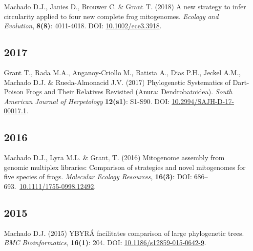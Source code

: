 \documentclass[11pt, letterpaper, sans]{moderncv}
\begin{document}
    {\setlength{\parskip}{.5em}\renewcommand{\baselinestretch}{2.0}\begin{hangparas}{.25in}{1}
		Machado D.J., Janies D., Brouwer C. \& Grant T. (2018) A new strategy to infer circularity applied to four new complete frog mitogenomes. \emph{Ecology and Evolution}, \textbf{8(8)}: 4011-4018. DOI: \href{http://doi.wiley.com/10.1002/ece3.3918}{10.1002/ece3.3918}.
	\end{hangparas}}


\subsection{2017}

    {\setlength{\parskip}{.5em}\renewcommand{\baselinestretch}{2.0}\begin{hangparas}{.25in}{1}
		Grant T., Rada M.A., Anganoy-Criollo M., Batista A., Dias P.H., Jeckel A.M., Machado D.J. \& Rueda-Almonacid J.V. (2017) Phylogenetic Systematics of Dart-Poison Frogs and Their Relatives Revisited (Anura: Dendrobatoidea). \emph{South American Journal of Herpetology} \textbf{12(s1)}: S1-S90. DOI: \href{http://www.bioone.org/doi/10.2994/SAJH-D-17-00017.1}{10.2994/SAJH-D-17-00017.1}.
	\end{hangparas}}


\subsection{2016}

    {\setlength{\parskip}{.5em}\renewcommand{\baselinestretch}{2.0}\begin{hangparas}{.25in}{1}
		Machado D.J., Lyra M.L. \& Grant, T. (2016) Mitogenome assembly from genomic multiplex libraries: Comparison of strategies and novel mitogenomes for five species of frogs. \emph{Molecular Ecology Resources}, \textbf{16(3)}: DOI: 686--693.~\href{https://doi.org/10.1111/1755-0998.12492}{10.1111/1755-0998.12492}.
	\end{hangparas}}


\subsection{2015}

    {\setlength{\parskip}{.5em}\renewcommand{\baselinestretch}{2.0}\begin{hangparas}{.25in}{1}
		Machado D.J. (2015) YBYRÁ facilitates comparison of large phylogenetic trees. \emph{BMC Bioinformatics}, \textbf{16(1)}: 204. DOI: \href{https://doi.org/10.1186/s12859-015-0642-9}{10.1186/s12859-015-0642-9}.
	\end{hangparas}}
\end{document}
